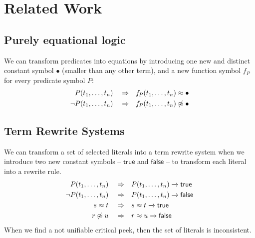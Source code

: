 
\chapter{Related Work}


\section{Purely equational logic}

We can transform predicates into equations
by introducing one new and distinct constant symbol $\bullet$ (smaller than any other term),
and a new function symbol $f\!_P$ for every predicate symbol $P$:
\begin{align*}
	P(t_1,\ldots,t_n) \quad\Rightarrow&\quad f\!_P(t_1,\ldots,t_n) \approx \bullet \\
	\lnot P(t_1,\ldots,t_n) \quad\Rightarrow&\quad f\!_P(t_1,\ldots,t_n) \not\approx \bullet
\end{align*}

\section{Term Rewrite Systems}

We can transform a set of selected literals into a term rewrite system
when we introduce two new constant symbols -- $\mathsf{true}$ and $\mathsf{false}$ --
to transform each literal into a rewrite rule.
\begin{align*}
P(t_1,\ldots,t_n) \quad\Rightarrow &\quad P(t_1,\ldots,t_n) \xrightarrow[{}]{} \mathsf{true}
\\
\lnot P(t_1,\ldots,t_n) \quad\Rightarrow &\quad P(t_1,\ldots,t_n) \xrightarrow[{}]{} \mathsf{false}
\\
s \approx t \quad\Rightarrow&\quad s \approx t\xrightarrow[{}]{} \mathsf{true}
\\
r \not\approx u \quad\Rightarrow&\quad r \approx u\xrightarrow[{}]{}  \mathsf{false}
\end{align*}
When we find a not unifiable critical peek, then the set of literals is inconsistent.

